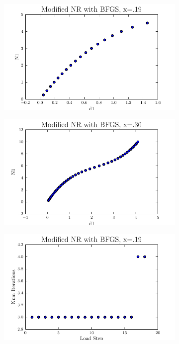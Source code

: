 \documentclass[10pt,letterpaper]{article}
\begin{document}
\begin{figure}[!tbh]
  \begin{subfigure}[b]{.6\textwidth}
    \includegraphics[width=\textwidth]{moded_nr_bfgs_x19.pdf}
    \caption{}
    \label{fig5:label:a}
  \end{subfigure}
  \hfill
  \begin{subfigure}[b]{.6\textwidth}
    \includegraphics[width=\textwidth]{moded_nr_bfgs_x30.pdf}
    \caption{}
    \label{fig5:label:b}
  \end{subfigure}
  \hfill
    \begin{subfigure}[b]{.6\textwidth}
    \includegraphics[width=\textwidth]{moded_nr_bfgs_x19_conv.pdf}

\end{subfigure}
\end{figure}
\end{document}
